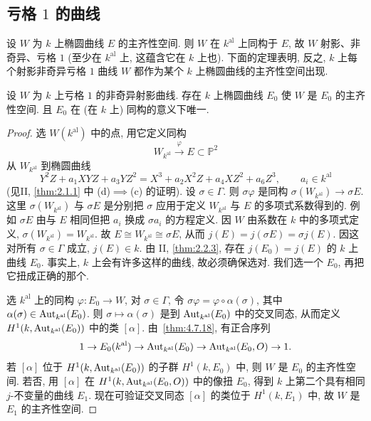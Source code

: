\subsection*{亏格 $1$ 的曲线}

设 $W$ 为 $k$ 上椭圆曲线 $E$ 的主齐性空间. 则 $W$ 在 $k^{\mathrm{al}}$ 上同构于 $E$, 故 $W$ 射影、非奇异、亏格 $1$ (至少在 $k^{\mathrm{al}}$ 上, 这蕴含它在 $k$ 上也). 下面的定理表明, 反之, $k$ 上每个射影非奇异亏格 $1$ 曲线 $W$ 都作为某个 $k$ 上椭圆曲线的主齐性空间出现.

\begin{theorem} \label{thm:4.7.19} 
设 $W$ 为 $k$ 上亏格 $1$ 的非奇异射影曲线. 存在 $k$ 上椭圆曲线 $E_0$ 使 $W$ 是 $E_0$ 的主齐性空间. 且 $E_0$ 在 (在 $k$ 上) 同构的意义下唯一.
\end{theorem}

\begin{proof}
选 $W(k^{\mathrm{al}})$ 中的点, 用它定义同构
\[
W_{k^{\mathrm{al}}}\xrightarrow{\varphi}E\subset\mathbb{P}^2
\]
从 $W_{k^{\mathrm{al}}}$ 到椭圆曲线
\[
Y^2Z + a_1XYZ + a_3YZ^2 = X^3 + a_2X^2Z + a_4XZ^2 + a_6Z^3, \qquad a_i\in k^{\mathrm{al}}
\]
(见II, \ref{thm:2.1.1} 中 (d)$\implies$(c) 的证明). 设 $\sigma\in\Gamma$. 则 $\sigma\varphi$ 是同构 $\sigma(W_{k^{\mathrm{al}}})\to\sigma E$. 这里 $\sigma(W_{k^{\mathrm{al}}})$ 与 $\sigma E$ 是分别把 $\sigma$ 应用于定义 $W_{k^{\mathrm{al}}}$ 与 $E$ 的多项式系数得到的. 例如 $\sigma E$ 由与 $E$ 相同但把 $a_i$ 换成 $\sigma a_i$ 的方程定义. 因 $W$ 由系数在 $k$ 中的多项式定义, $\sigma(W_{k^{\mathrm{al}}}) = W_{k^{\mathrm{al}}}$. 故 $E\cong W_{k^{\mathrm{al}}}\cong\sigma E$, 从而 $j(E) = j(\sigma E) = \sigma j(E)$. 因这对所有 $\sigma\in\Gamma$ 成立, $j(E)\in k$. 由 II, \ref{thm:2.2.3}, 存在 $j(E_0) = j(E)$ 的 $k$ 上曲线 $E_0$. 事实上, $k$ 上会有许多这样的曲线, 故必须确保选对. 我们选一个 $E_0$, 再把它扭成正确的那个.

选 $k^{\mathrm{al}}$ 上的同构 $\varphi\colon E_0\to W$, 对 $\sigma\in\Gamma$, 令 $\sigma\varphi = \varphi\circ\alpha(\sigma)$, 其中 $\alpha(\sigma)\in\operatorname{Aut}_{k^{\mathrm{al}}}(E_0)$. 则 $\sigma\mapsto\alpha(\sigma)$ 是到 $\operatorname{Aut}_{k^{\mathrm{al}}}(E_0)$ 中的交叉同态, 从而定义 $H^1(k, \operatorname{Aut}_{k^{\mathrm{al}}}(E_0))$ 中的类 $[\alpha]$. 由~\ref{thm:4.7.18}, 有正合序列
\[
1\to E_0(k^{\mathrm{al}})\to\operatorname{Aut}_{k^{\mathrm{al}}}(E_0)\to\operatorname{Aut}_{k^{\mathrm{al}}}(E_0, O)\to 1.
\]
若 $[\alpha]$ 位于 $H^1(k, \operatorname{Aut}_{k^{\mathrm{al}}}(E_0))$ 的子群 $H^1(k, E_0)$ 中, 则 $W$ 是 $E_0$ 的主齐性空间. 若否, 用 $[\alpha]$ 在 $H^1(k, \operatorname{Aut}_{k^{\mathrm{al}}}(E_0, O))$ 中的像扭 $E_0$, 得到 $k$ 上第二个具有相同 $j$-不变量的曲线 $E_1$. 现在可验证交叉同态 $[\alpha]$ 的类位于 $H^1(k, E_1)$ 中, 故 $W$ 是 $E_1$ 的主齐性空间.
\end{proof}

